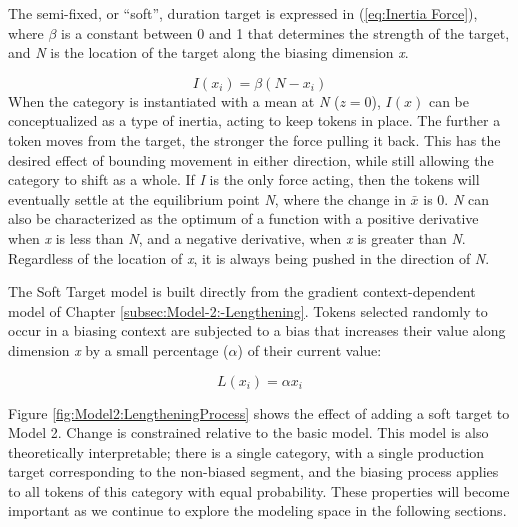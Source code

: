 The semi-fixed, or “soft”, duration target is expressed in (\ref{eq:Inertia Force}),
where $\beta$ is a constant between 0 and 1 that determines the strength
of the target, and \emph{N} is the location of the target along the
biasing dimension \emph{x}. 

\begin{equation}
I(x_{i})=\beta(N-x_{i})\label{eq:Inertia Force}
\end{equation}
When the category is instantiated with a mean at \emph{N} ($z=0$),
$I(x)$ can be conceptualized as a type of inertia, acting to keep
tokens in place. The further a token moves from the target, the stronger
the force pulling it back. This has the desired effect of bounding
movement in either direction, while still allowing the category to
shift as a whole. If \emph{I} is the only force acting, then the tokens
will eventually settle at the equilibrium point \emph{N}, where the
change in \emph{$\bar{x}$} is 0. \emph{N} can also be characterized
as the optimum of a function with a positive derivative when \emph{x}
is less than \emph{N}, and a negative derivative, when \emph{x} is
greater than \emph{N}. Regardless of the location of \emph{x}, it
is always being pushed in the direction of \emph{N}. 

The Soft Target model is built directly from the gradient context-dependent
model of Chapter \ref{subsec:Model-2:-Lengthening}. Tokens selected
randomly to occur in a biasing context are subjected to a bias that
increases their value along dimension \emph{x} by a small percentage
($\alpha$) of their current value: 

\begin{equation}
L(x_{i})=\alpha x_{i}\label{eq:Lengthening Force}
\end{equation}

Figure \ref{fig:Model2:LengtheningProcess} shows the effect of adding
a soft target to Model 2. Change is constrained relative to the basic
model. This model is also theoretically interpretable; there is a
single category, with a single production target corresponding to
the non-biased segment, and the biasing process applies to all tokens
of this category with equal probability. These properties will become
important as we continue to explore the modeling space in the following
sections. 

